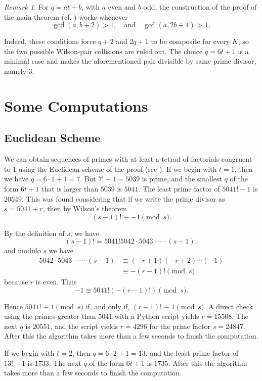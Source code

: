 \documentclass[12pt]{amsart}
\theoremstyle{remark}
\newtheorem{remark}[thm]{Remark}
\begin{document}
\begin{remark}
For $q=at+b$, with $a$ even and $b$ odd, the construction of the proof of the main theorem (cf. \cite[Remark 2.8, p. 556]{HS02}) works whenever
\[
\gcd(a,b+2)>1,\quad\text{and}\quad \gcd(a,2b+1)>1,
\]

Indeed, these conditions force $q+2$ and $2q+1$ to be composite for every $K$, so the two possible Wilson-pair collisions are ruled out. The choice $q=6t+1$ is a minimal case and makes the aforementioned pair divisible by same prime divisor, namely $3$.
\end{remark}

\section{Some Computations}

\subsection{Euclidean Scheme}
We can obtain sequences of primes with at least a tetrad of factorials congruent to $1$ using the
Euclidean scheme of the proof (see \cite[Section 4.3]{GKP94}). If we begin
with $t=1$, then we have $q=6\cdot 1+1 = 7$. But $7!-1=5039$ is prime, and the smallest $q$ of the
form $6t+1$ that is larger than $5039$ is $5041$. The least prime factor of $5041!-1$ is $20549$. This was
found considering that if we write the prime divisor as $s=5041+r$, then by Wilson's theorem
\[
 (s-1)!\equiv -1\pmod{s}.
\]

By the definition of $s$, we have
\[
(s-1)! = 5041!5042\cdot 5043 \cdot \cdots \cdot (s-1),
\]
and modulo $s$ we have
\begin{align*}
5042\cdot 5043 \cdot\cdots \cdots (s-1) &\equiv (-r+1)(-r+2)\cdots(-1)\\
&\equiv -(r-1)!\pmod{s}
\end{align*}
because $r$ is even. Thus
\[
 -1 \equiv 5041!(-(r-1)!) \pmod{s}.
\]

Hence $5041!\equiv 1 \pmod{s}$ if, and only if, $(r-1)!\equiv 1 \pmod{s}$. A direct check using the
primes greater than $5041$ with a Python script yields $r=15508$. The next $q$ is $20551$, and the script yields $r=4296$ for the prime factor $s=24847$. After this the algorithm takes more than a few seconds to finish the computation.

If we begin with $t=2$, then $q=6\cdot 2 + 1 = 13$, and the least prime factor of $13!-1$ is $1733$. The
next $q$ of the form $6t+1$ is $1735$. After this the algorithm takes more than a few seconds to finish the computation.
\end{document}
